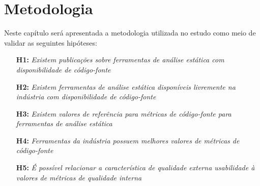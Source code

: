 \documentclass[qual, classic, a4paper]{ufbathesis}
\begin{document}
\chapter{Metodologia}

%
%

Neste capítulo será apresentada a metodologia utilizada no estudo como meio
de validar as seguintes hipóteses:

\begin{enumerate}
  \item[{\bf H1:}] {\em Existem publicações sobre ferramentas de análise
    estática com disponibilidade de código-fonte}
  \item[{\bf H2:}] {\em Existem ferramentas de análise estática disponíveis
    livremente na indústria com disponibilidade de código-fonte}
  \item[{\bf H3:}] {\em Existem valores de referência para métricas de
    código-fonte para ferramentas de análise estática}
  \item[{\bf H4:}] {\em Ferramentas da indústria possuem melhores valores de
    métricas de código-fonte}
  \item[{\bf H5:}] {\em É possível relacionar a característica de qualidade
    externa usabilidade à valores de métricas de qualidade interna}
\end{enumerate}
\end{document}
